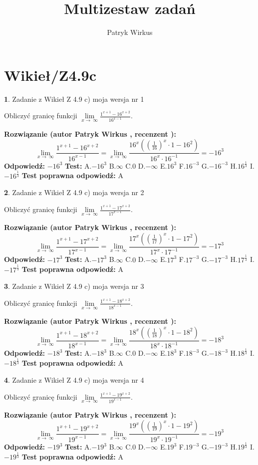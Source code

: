 \documentclass[12pt, a4paper]{article}
\title{Multizestaw zadań}
\author{Patryk Wirkus}
\date{}
\theoremstyle{definition} %
\newtheorem{zad}{}
\newcommand{\kategoria}[1]{\section{#1}}
\newcommand{\zadStart}[1]{\begin{zad}#1\newline}
\newcommand{\zadStop}{\end{zad}}
\newcommand{\rozwStart}[2]{\noindent \textbf{Rozwiązanie (autor #1 , recenzent #2): }\newline}
\newcommand{\rozwStop}{\newline}
\newcommand{\odpStart}{\noindent \textbf{Odpowiedź:}\newline}
\newcommand{\odpStop}{\newline}
\newcommand{\testStart}{\noindent \textbf{Test:}\newline}
\newcommand{\testStop}{\newline}
\newcommand{\kluczStart}{\noindent \textbf{Test poprawna odpowiedź:}\newline}
\newcommand{\kluczStop}{\newline}
\begin{document}
\maketitle

\kategoria{Wikieł/Z4.9c}


\zadStart{Zadanie z Wikieł Z 4.9 c) moja wersja nr 1}


Obliczyć granicę funkcji  $\lim\limits_{x\to\ \infty}\frac{1^{x+1}-16^{x+2}}{16^{x-1}}$.
\zadStop
\rozwStart{Patryk Wirkus}{}
$$\lim\limits_{x\to\ \infty}\frac{1^{x+1}-16^{x+2}}{16^{x-1}}=\lim\limits_{x\to\ \infty}\frac{16^{x}((\frac{1}{16})^{x}\cdot 1 -16^{2})}{16^{x}\cdot 16^{-1}} = -16^{3}$$
\rozwStop
\odpStart
$-16^{3}$
\odpStop
\testStart
A.$-16^{3}$ B.$\infty$ C.$0$ D.$-\infty$ E.$16^{3}$
F.$16^{-3}$ G.$-16^{-3}$
H.$16^{\frac{1}{3}}$
I.$-16^{\frac{1}{3}}$
\testStop
\kluczStart
A
\kluczStop



\zadStart{Zadanie z Wikieł Z 4.9 c) moja wersja nr 2}


Obliczyć granicę funkcji  $\lim\limits_{x\to\ \infty}\frac{1^{x+1}-17^{x+2}}{17^{x-1}}$.
\zadStop
\rozwStart{Patryk Wirkus}{}
$$\lim\limits_{x\to\ \infty}\frac{1^{x+1}-17^{x+2}}{17^{x-1}}=\lim\limits_{x\to\ \infty}\frac{17^{x}((\frac{1}{17})^{x}\cdot 1 -17^{2})}{17^{x}\cdot 17^{-1}} = -17^{3}$$
\rozwStop
\odpStart
$-17^{3}$
\odpStop
\testStart
A.$-17^{3}$ B.$\infty$ C.$0$ D.$-\infty$ E.$17^{3}$
F.$17^{-3}$ G.$-17^{-3}$
H.$17^{\frac{1}{3}}$
I.$-17^{\frac{1}{3}}$
\testStop
\kluczStart
A
\kluczStop



\zadStart{Zadanie z Wikieł Z 4.9 c) moja wersja nr 3}


Obliczyć granicę funkcji  $\lim\limits_{x\to\ \infty}\frac{1^{x+1}-18^{x+2}}{18^{x-1}}$.
\zadStop
\rozwStart{Patryk Wirkus}{}
$$\lim\limits_{x\to\ \infty}\frac{1^{x+1}-18^{x+2}}{18^{x-1}}=\lim\limits_{x\to\ \infty}\frac{18^{x}((\frac{1}{18})^{x}\cdot 1 -18^{2})}{18^{x}\cdot 18^{-1}} = -18^{3}$$
\rozwStop
\odpStart
$-18^{3}$
\odpStop
\testStart
A.$-18^{3}$ B.$\infty$ C.$0$ D.$-\infty$ E.$18^{3}$
F.$18^{-3}$ G.$-18^{-3}$
H.$18^{\frac{1}{3}}$
I.$-18^{\frac{1}{3}}$
\testStop
\kluczStart
A
\kluczStop



\zadStart{Zadanie z Wikieł Z 4.9 c) moja wersja nr 4}


Obliczyć granicę funkcji  $\lim\limits_{x\to\ \infty}\frac{1^{x+1}-19^{x+2}}{19^{x-1}}$.
\zadStop
\rozwStart{Patryk Wirkus}{}
$$\lim\limits_{x\to\ \infty}\frac{1^{x+1}-19^{x+2}}{19^{x-1}}=\lim\limits_{x\to\ \infty}\frac{19^{x}((\frac{1}{19})^{x}\cdot 1 -19^{2})}{19^{x}\cdot 19^{-1}} = -19^{3}$$
\rozwStop
\odpStart
$-19^{3}$
\odpStop
\testStart
A.$-19^{3}$ B.$\infty$ C.$0$ D.$-\infty$ E.$19^{3}$
F.$19^{-3}$ G.$-19^{-3}$
H.$19^{\frac{1}{3}}$
I.$-19^{\frac{1}{3}}$
\testStop
\kluczStart
A
\kluczStop
\end{document}
